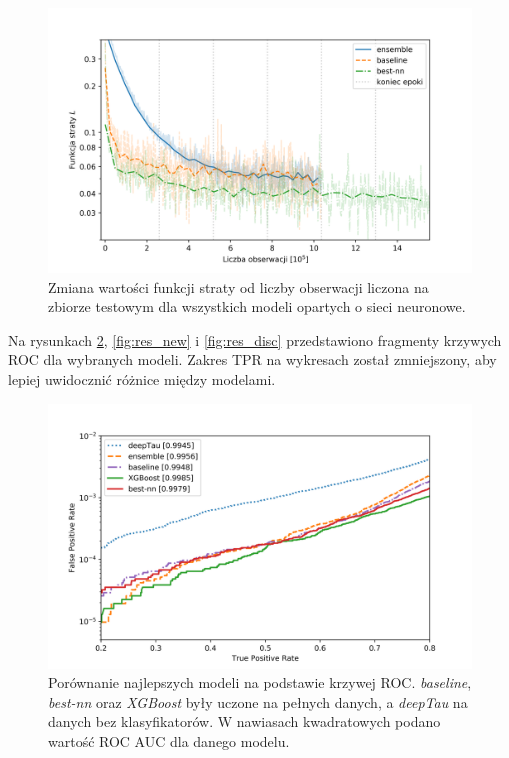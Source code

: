 \documentclass{pracalicmgr}
\begin{document}
	\begin{figure}
	\centering
	\includegraphics[width=1.\textwidth]{loss_all.png}
	\caption{Zmiana wartości funkcji straty od liczby obserwacji liczona na zbiorze testowym dla wszystkich modeli opartych o sieci neuronowe.}
	\label{fig:loss_all}
	\end{figure}	
	Na rysunkach \ref{fig:res_best}, \ref{fig:res_new} i \ref{fig:res_disc} przedstawiono fragmenty krzywych ROC dla wybranych modeli. Zakres TPR na wykresach został zmniejszony, aby lepiej uwidocznić różnice między modelami.
	
	\begin{figure}
	\centering
	\includegraphics[width=1\textwidth]{best_models.png}
	\caption{Porównanie najlepszych modeli na podstawie krzywej ROC.  \textit{baseline}, \textit{best-nn} oraz \textit{XGBoost} były uczone na pełnych danych, a \textit{deepTau} na danych bez klasyfikatorów. W nawiasach kwadratowych podano wartość ROC AUC dla danego modelu.}
	\label{fig:res_best}	
	\end{figure}
	
\end{document}
